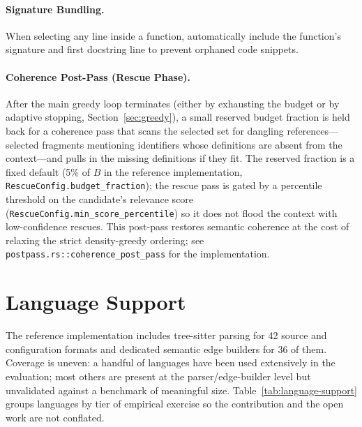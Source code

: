 \documentclass[11pt, a4paper]{article}
\begin{document}
\paragraph{Signature Bundling.} When selecting any line inside a function, automatically include the function's signature and first docstring line to prevent orphaned code snippets.

\paragraph{Coherence Post-Pass (Rescue Phase).} After the main greedy loop terminates (either by exhausting the budget or by adaptive stopping, Section~\ref{sec:greedy}), a small reserved budget fraction is held back for a coherence pass that scans the selected set for dangling references---selected fragments mentioning identifiers whose definitions are absent from the context---and pulls in the missing definitions if they fit. The reserved fraction is a fixed default (5\% of $B$ in the reference implementation, \texttt{RescueConfig.budget\_fraction}); the rescue pass is gated by a percentile threshold on the candidate's relevance score (\texttt{RescueConfig.min\_score\_percentile}) so it does not flood the context with low-confidence rescues. This post-pass restores semantic coherence at the cost of relaxing the strict density-greedy ordering; see \texttt{postpass.rs::coherence\_post\_pass} for the implementation.

\newpage
\section{Language Support}
\label{sec:impl-inventory}

The reference implementation includes tree-sitter parsing for 42 source and configuration formats and dedicated semantic edge builders for 36 of them. Coverage is uneven: a handful of languages have been used extensively in the evaluation; most others are present at the parser/edge-builder level but unvalidated against a benchmark of meaningful size. Table~\ref{tab:language-support} groups languages by tier of empirical exercise so the contribution and the open work are not conflated.
\end{document}
